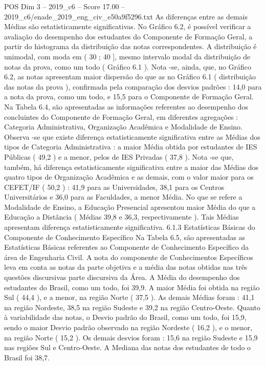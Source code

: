 \begin{textsample}{POS Dim 3 – 2019\_c6 – Score 17.00 – 2019\_c6/enade\_2019\_eng\_civ\_e50a9f5296.txt}
As diferenças entre as demais Médias são estatisticamente significativas.
No Gráfico 6.2, é possível verificar a avaliação do desempenho dos estudantes do Componente de Formação Geral, a partir do histograma da distribuição das notas correspondentes.
A distribuição é unimodal, com moda em ( 30 ; 40 ], mesmo intervalo modal da distribuição de notas da prova, como um todo ( Gráfico 6.1 ).
Nota -se, ainda, que, no Gráfico 6.2, as notas apresentam maior dispersão do que as no Gráfico 6.1 ( distribuição das notas da prova ), confirmada pela comparação dos desvios padrões : 14,0 para a nota da prova, como um todo, e 15,5 para o Componente de Formação Geral.
Na Tabela 6.4, são apresentadas as informações referentes ao desempenho dos concluintes do Componente de Formação Geral, em diferentes agregações : Categoria Administrativa, Organização Acadêmica e Modalidade de Ensino.
Observa -se que existe diferença estatisticamente significativa entre as Médias dos tipos de Categoria Administrativa : a maior Média obtida por estudantes de IES Públicas ( 49,2 ) e a menor, pelos de IES Privadas ( 37,8 ).
Nota -se que, também, há diferença estatisticamente significativa entre a maior das Médias dos quatro tipos de Organização Acadêmica e as demais, com o valor maior para os CEFET/IF ( 50,2 ) : 41,9 para as Universidades, 38,1 para os Centros Universitários e 36,0 para as Faculdades, a menor Média.
No que se refere a Modalidade de Ensino, a Educação Presencial apresentou maior Média do que a Educação a Distância ( Médias 39,8 e 36,3, respectivamente ).
Tais Médias apresentam diferença estatisticamente significativa. 6.1.3 Estatísticas Básicas do Componente de Conhecimento Específico Na Tabela 6.5, são apresentadas as Estatísticas Básicas referentes ao Componente de Conhecimento Específico da área de Engenharia Civil.
A nota do componente de Conhecimentos Específicos leva em conta as notas da parte objetiva e a média das notas obtidas nas três questões discursivas parte discursiva da Área.
A Média do desempenho dos estudantes do Brasil, como um todo, foi 39,9.
A maior Média foi obtida na região Sul ( 44,4 ), e a menor, na região Norte ( 37,5 ).
As demais Médias foram : 41,1 na região Nordeste, 38,5 na região Sudeste e 39,2 na região Centro-Oeste.
Quanto à variabilidade das notas, o Desvio padrão do Brasil, como um todo, foi 15,9, sendo o maior Desvio padrão observado na região Nordeste ( 16,2 ), e o menor, na região Norte ( 15,2 ).
Os demais desvios foram : 15,6 na região Sudeste e 15,9 nas regiões Sul e Centro-Oeste.
A Mediana das notas dos estudantes de todo o Brasil foi 38,7.

\end{textsample}
